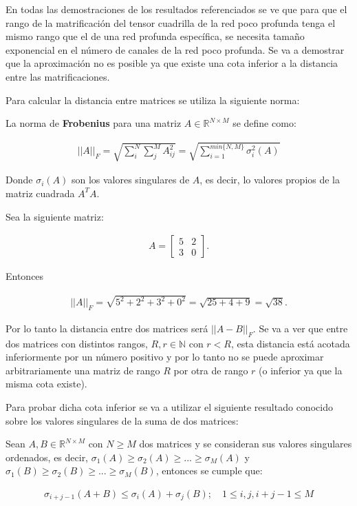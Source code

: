 En todas las demostraciones de los resultados referenciados se ve que para que el rango de la matrificación del tensor cuadrilla de la red poco profunda tenga el mismo rango que el de una red profunda específica, se necesita tamaño exponencial en el número de canales de la red poco profunda. Se va a demostrar que la aproximación no es posible ya que existe una cota inferior a la distancia entre las matrificaciones.

Para calcular la distancia entre matrices se utiliza la siguiente norma:


\begin{definicion}
La norma de \textbf{Frobenius} para una matriz $A\in\mathbb{R}^{N\times M}$ se define como:

\begin{align*}
||A||_F = \sqrt{\sum_i^N \sum_j^M A_{ij}^2} = \sqrt{\sum_{i=1}^{min\{N,M\}}\sigma_i^2(A)}
\end{align*}

Donde $\sigma_i(A)$ son los valores singulares de $A$, es decir, lo valores propios de la matriz cuadrada $A^T A$.
\end{definicion}

\begin{ejemplo}
Sea la siguiente matriz:

\begin{align*}
A = \begin{bmatrix}
5 & 2\\
3 & 0
\end{bmatrix}.
\end{align*}

Entonces

\begin{align*}
||A||_F = \sqrt{5^2 + 2^2 + 3^2 + 0^2} = \sqrt{25+4+9} = \sqrt{38}.
\end{align*}
\end{ejemplo}

Por lo tanto la distancia entre dos matrices será $||A-B||_F$. Se va a ver que entre dos matrices con distintos rangos, $R,r\in \mathbb{N}$ con $r < R$, esta distancia está acotada inferiormente por un número positivo y por lo tanto no se puede aproximar arbitrariamente una matriz de rango $R$ por otra de rango $r$ (o inferior ya que la misma cota existe).

Para probar dicha cota inferior se va a utilizar el siguiente resultado conocido sobre los valores singulares de la suma de dos matrices:


\begin{lema}
Sean $A,B\in \mathbb{R}^{N\times M}$ con $N \geq M$ dos matrices y se consideran sus valores singulares ordenados, es decir, $\sigma_1(A) \geq \sigma_2(A) \geq ... \geq \sigma_M(A)$ y $\sigma_1(B) \geq \sigma_2(B) \geq ... \geq \sigma_M(B)$, entonces se cumple que:

\begin{align}
\sigma_{i+j-1}(A+B) \leq \sigma_i(A) + \sigma_j(B); \quad 1 \leq i,j,i+j-1 \leq M
\end{align}
\end{lema}

